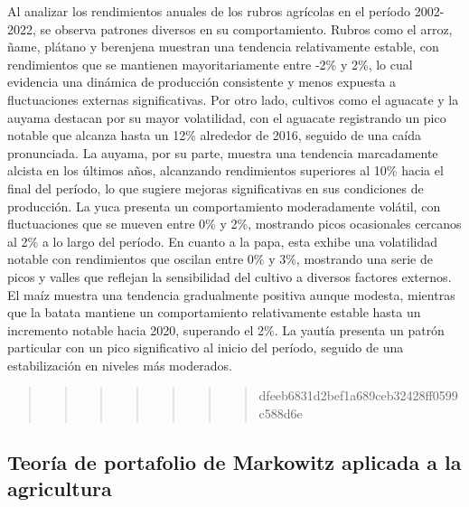 \documentclass[
  letterpaper,
  DIV=11,
  numbers=noendperiod]{scrartcl}
\begin{document}
Al analizar los rendimientos anuales de los rubros agrícolas en el
período 2002-2022, se observa patrones diversos en su comportamiento.
Rubros como el arroz, ñame, plátano y berenjena muestran una tendencia
relativamente estable, con rendimientos que se mantienen
mayoritariamente entre -2\% y 2\%, lo cual evidencia una dinámica de
producción consistente y menos expuesta a fluctuaciones externas
significativas. Por otro lado, cultivos como el aguacate y la auyama
destacan por su mayor volatilidad, con el aguacate registrando un pico
notable que alcanza hasta un 12\% alrededor de 2016, seguido de una
caída pronunciada. La auyama, por su parte, muestra una tendencia
marcadamente alcista en los últimos años, alcanzando rendimientos
superiores al 10\% hacia el final del período, lo que sugiere mejoras
significativas en sus condiciones de producción. La yuca presenta un
comportamiento moderadamente volátil, con fluctuaciones que se mueven
entre 0\% y 2\%, mostrando picos ocasionales cercanos al 2\% a lo largo
del período. En cuanto a la papa, esta exhibe una volatilidad notable
con rendimientos que oscilan entre 0\% y 3\%, mostrando una serie de
picos y valles que reflejan la sensibilidad del cultivo a diversos
factores externos. El maíz muestra una tendencia gradualmente positiva
aunque modesta, mientras que la batata mantiene un comportamiento
relativamente estable hasta un incremento notable hacia 2020, superando
el 2\%. La yautía presenta un patrón particular con un pico
significativo al inicio del período, seguido de una estabilización en
niveles más moderados.

\begin{quote}
\begin{quote}
\begin{quote}
\begin{quote}
\begin{quote}
\begin{quote}
\begin{quote}
dfeeb6831d2bef1a689ceb32428ff0599c588d6e
\end{quote}
\end{quote}
\end{quote}
\end{quote}
\end{quote}
\end{quote}
\end{quote}

\subsection{Teoría de portafolio de Markowitz aplicada a la
agricultura}\label{teoruxeda-de-portafolio-de-markowitz-aplicada-a-la-agricultura}
\end{document}
